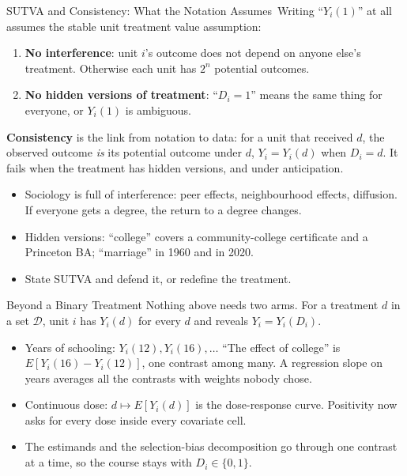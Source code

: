 \documentclass[aspectratio=169,11pt,xcolor=dvipsnames]{beamer}
\newcommand{\E}{E}
\newcommand{\core}{\,\raisebox{0.6pt}{\textcolor{corestar}{$\bigstar$}}}
\begin{document}
\begin{frame}{SUTVA and Consistency: What the Notation Assumes\core}
Writing ``$Y_i(1)$'' at all assumes the \alert{stable unit treatment value
assumption}:
\begin{enumerate}\itemsep2pt
  \item \textbf{No interference}: unit $i$'s outcome does not depend on anyone
        else's treatment. Otherwise each unit has $2^n$ potential outcomes.
  \item \textbf{No hidden versions of treatment}: ``$D_i = 1$'' means the
        same thing for everyone, or $Y_i(1)$ is ambiguous.
\end{enumerate}
\vskip2pt
\textbf{Consistency} is the link from notation to data: for a unit that
received $d$, the observed outcome \emph{is} its potential outcome under $d$,
$Y_i = Y_i(d)$ when $D_i = d$. It fails when the treatment has hidden
versions, and under anticipation.
\vskip2pt
\begin{itemize}\itemsep2pt
  \item Sociology is full of interference: peer effects, neighbourhood
        effects, diffusion. If everyone gets a degree, the return to a degree
        changes.
  \item Hidden versions: ``college'' covers a community-college certificate
        and a Princeton BA; ``marriage'' in 1960 and in 2020.
  \item State SUTVA and defend it, or redefine the treatment.
\end{itemize}
\end{frame}

\begin{frame}{Beyond a Binary Treatment}
Nothing above needs two arms. For a treatment $d$ in a set $\mathcal{D}$,
unit $i$ has $Y_i(d)$ for every $d$ and reveals $Y_i = Y_i(D_i)$.
\begin{itemize}\itemsep3pt
  \item Years of schooling: $Y_i(12), Y_i(16), \ldots$ ``The effect of
        college'' is $\E[Y_i(16) - Y_i(12)]$, one contrast among many. A
        regression slope on years averages all the contrasts with weights
        nobody chose.
  \item Continuous dose: $d \mapsto \E[Y_i(d)]$ is the dose-response curve.
        Positivity now asks for every dose inside every covariate cell.
  \item The estimands and the selection-bias decomposition go through one
        contrast at a time, so the course stays with $D_i \in \{0,1\}$.
\end{itemize}
\end{frame}
\end{document}
